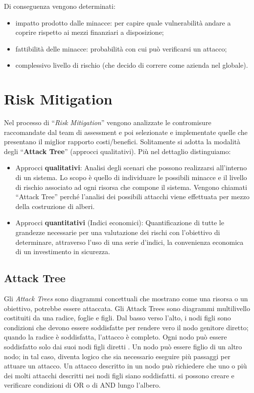 Di conseguenza vengono determinati:

\begin{itemize}
    \item impatto prodotto dalle minacce: per capire quale vulnerabilità
          andare a coprire rispetto ai
          mezzi finanziari a disposizione;
    \item fattibilità delle minacce: probabilità con cui può verificarsi
          un attacco;
    \item complessivo livello di rischio
          (che decido di correre come azienda nel globale).
\end{itemize}

\section{Risk Mitigation}

Nel processo di “\textit{Risk Mitigation}” vengono analizzate le contromisure
raccomandate dal team di
assessment e poi selezionate e implementate quelle che presentano il
miglior rapporto costi/benefici.
Solitamente si adotta la modalità degli “\textbf{Attack Tree}”
(approcci qualitativi).
Più nel dettaglio distinguiamo:

\begin{itemize}
    \item Approcci \textbf{qualitativi}: Analisi degli scenari che possono
          realizzarsi all'interno di un sistema.
          Lo scopo è quello di individuare le possibili minacce e il livello di
          rischio associato ad ogni
          risorsa che compone il sistema. Vengono chiamati “Attack Tree” perché
          l'analisi dei
          possibili attacchi viene effettuata per mezzo della costruzione di alberi.
    \item Approcci \textbf{quantitativi} (Indici economici): Quantificazione di
          tutte le grandezze necessarie
          per una valutazione dei rischi con l'obiettivo di determinare,
          attraverso l'uso di una serie
          d'indici, la convenienza economica di un investimento in sicurezza.
\end{itemize}

\subsection{Attack Tree}

Gli \textit{Attack Trees} sono diagrammi concettuali che mostrano come una risorsa
o un obiettivo, potrebbe essere
attaccata.
Gli Attack Trees sono diagrammi multilivello costituiti da una radice, foglie e
figli. Dal basso verso l'alto, i nodi
figli sono condizioni che devono essere soddisfatte per rendere vero il nodo
genitore diretto; quando la radice è
soddisfatta, l'attacco è completo. Ogni nodo può essere soddisfatto solo dai
suoi nodi figli diretti . Un nodo può
essere figlio di un altro nodo; in tal caso, diventa logico che sia necessario
eseguire più passaggi per attuare un
attacco. Un attacco descritto in un nodo può richiedere che uno o più dei molti
attacchi descritti nei nodi figli siano
soddisfatti. si possono creare e verificare condizioni di OR o di AND lungo
l'albero.

